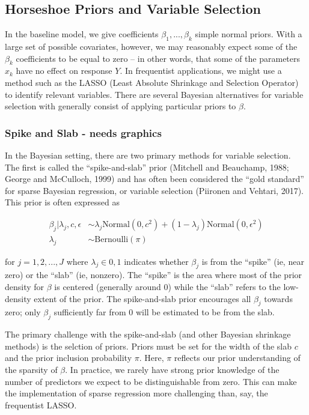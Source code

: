 \documentclass[]{article}
\begin{document}
\subsection{Horseshoe Priors and Variable
Selection}\label{horseshoe-priors-and-variable-selection}

In the baseline model, we give coefficients \(\beta_1, ..., \beta_k\)
simple normal priors. With a large set of possible covariates, however,
we may reasonably expect some of the \(\beta_k\) coefficients to be
equal to zero -- in other words, that some of the parameters \(x_k\)
have no effect on response \(Y\). In frequentist applications, we might
use a method such as the LASSO (Least Absolute Shrinkage and Selection
Operator) to identify relevant variables. There are several Bayesian
alternatives for variable selection with generally consist of applying
particular priors to \(\beta\).

\subsubsection{Spike and Slab - needs
graphics}\label{spike-and-slab---needs-graphics}

In the Bayesian setting, there are two primary methods for variable
selection. The first is called the ``spike-and-slab'' prior (Mitchell
and Beauchamp, 1988; George and McCulloch, 1999) and has often been
considered the ``gold standard'' for sparse Bayesian regression, or
variable selection (Piironen and Vehtari, 2017). This prior is often
expressed as

\[
\begin{aligned}
\beta_j | \lambda_j, c, \epsilon & \sim \lambda_j \text{Normal}(0, c^2) + (1-\lambda_j)\text{Normal}(0, \epsilon^2) \\
\lambda_j & \sim \text{Bernoulli}(\pi)
\end{aligned}
\]

for \(j = 1, 2, ..., J\) where \(\lambda_j \in {0, 1}\) indicates
whether \(\beta_j\) is from the ``spike'' (ie, near zero) or the
``slab'' (ie, nonzero). The ``spike'' is the area where most of the
prior density for \(\beta\) is centered (generally around 0) while the
``slab'' refers to the low-density extent of the prior. The
spike-and-slab prior encourages all \(\beta_j\) towards zero; only
\(\beta_j\) sufficiently far from 0 will be estimated to be from the
slab.

The primary challenge with the spike-and-slab (and other Bayesian
shrinkage methods) is the selction of priors. Priors must be set for the
width of the slab \(c\) and the prior inclusion probability \(\pi\).
Here, \(\pi\) reflects our prior understanding of the sparsity of
\(\beta\). In practice, we rarely have strong prior knowledge of the
number of predictors we expect to be distinguishable from zero. This can
make the implementation of sparse regression more challenging than, say,
the frequentist LASSO.
\end{document}

